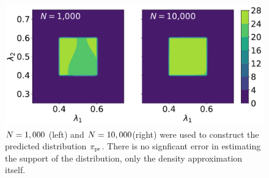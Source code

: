 \begin{figure}[ht]
\begin{minipage}{.975\textwidth}
\includegraphics[width=\linewidth]{./examples/identity/samp/N1-000_N1000-vs-N10-000_N10000.pdf}
\end{minipage}
\caption{
$N=1,000$ (left) and $N=10,000$(right) were used to construct the predicted distribution $\operatorname*{\pi_{pr}}$.
There is no signficant error in estimating the support of the distribution, only the density approximation itself.
}
\label{fig:ex:identity_sampling_approx}
\end{figure}

